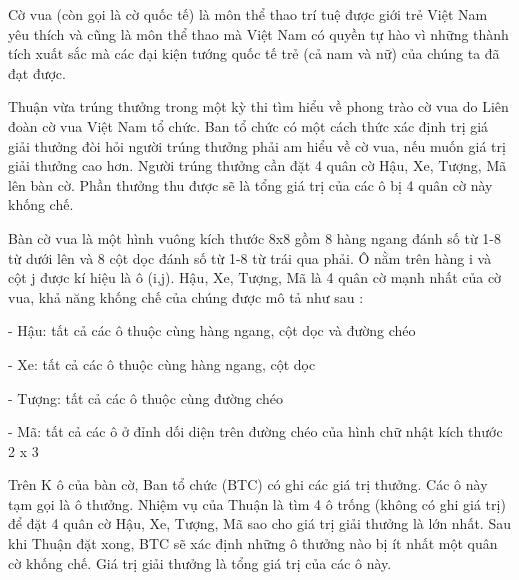 Cờ vua (còn gọi là cờ quốc tế) là môn thể thao trí tuệ được giới trẻ Việt Nam yêu thích và cũng là môn thể thao mà Việt Nam có quyền tự hào vì những thành tích xuất sắc mà các đại kiện tướng quốc tế trẻ (cả nam và nữ) của chúng ta đã đạt được.

Thuận vừa trúng thưởng trong một kỳ thi tìm hiểu về phong trào cờ vua do Liên đoàn cờ vua Việt Nam tổ chức. Ban tổ chức có một cách thức xác định trị giá giải thưởng đòi hỏi người trúng thưởng phải am hiểu về cờ vua, nếu muốn giá trị giải thưởng cao hơn. Người trúng thưởng cần đặt 4 quân cờ Hậu, Xe, Tượng, Mã lên bàn cờ. Phần thưởng thu được sẽ là tổng giá trị của các ô bị 4 quân cờ này khống chế.

Bàn cờ vua là một hình vuông kích thước 8x8 gồm 8 hàng ngang đánh số từ 1-8 từ dưới lên và 8 cột dọc đánh số từ 1-8 từ trái qua phải. Ô nằm trên hàng i và cột j được kí hiệu là ô (i,j). Hậu, Xe, Tượng, Mã là 4 quân cờ mạnh nhất của cờ vua, khả năng khống chế của chúng được mô tả như sau :

- Hậu: tất cả các ô thuộc cùng hàng ngang, cột dọc và đường chéo

- Xe: tất cả các ô thuộc cùng hàng ngang, cột dọc

- Tượng: tất cả các ô thuộc cùng đường chéo

- Mã: tất cả các ô ở đỉnh dối diện trên đường chéo của hình chữ nhật kích thước 2 x 3

Trên K ô của bàn cờ, Ban tổ chức (BTC) có ghi các giá trị thưởng. Các ô này tạm gọi là ô thưởng. Nhiệm vụ của Thuận là tìm 4 ô trống (không có ghi giá trị) để đặt 4 quân cờ Hậu, Xe, Tượng, Mã sao cho giá trị giải thưởng là lớn nhất. Sau khi Thuận đặt xong, BTC sẽ xác định những ô thưởng nào bị ít nhất một quân cờ khống chế. Giá trị giải thưởng là tổng giá trị của các ô này.